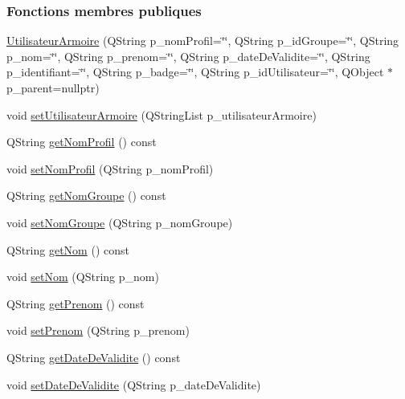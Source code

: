 \subsubsection*{Fonctions membres publiques}
\begin{DoxyCompactItemize}
\item 
\hyperlink{class_utilisateur_armoire_af2e72a14da4052a25ad02fd5876970a4}{Utilisateur\+Armoire} (Q\+String p\+\_\+nom\+Profil=\char`\"{}\char`\"{}, Q\+String p\+\_\+id\+Groupe=\char`\"{}\char`\"{}, Q\+String p\+\_\+nom=\char`\"{}\char`\"{}, Q\+String p\+\_\+prenom=\char`\"{}\char`\"{}, Q\+String p\+\_\+date\+De\+Validite=\char`\"{}\char`\"{}, Q\+String p\+\_\+identifiant=\char`\"{}\char`\"{}, Q\+String p\+\_\+badge=\char`\"{}\char`\"{}, Q\+String p\+\_\+id\+Utilisateur=\char`\"{}\char`\"{}, Q\+Object $\ast$p\+\_\+parent=nullptr)
\item 
void \hyperlink{class_utilisateur_armoire_a523423ac9e15b8260ca7f5ffc84c008d}{set\+Utilisateur\+Armoire} (Q\+String\+List p\+\_\+utilisateur\+Armoire)
\item 
Q\+String \hyperlink{class_utilisateur_armoire_a7ab03056bcfa00c2278488f5a381ac18}{get\+Nom\+Profil} () const
\item 
void \hyperlink{class_utilisateur_armoire_ad71dd9b23c6bc145a64727642b1ac3f5}{set\+Nom\+Profil} (Q\+String p\+\_\+nom\+Profil)
\item 
Q\+String \hyperlink{class_utilisateur_armoire_a714ef42e6907cf73312a55b7f896682a}{get\+Nom\+Groupe} () const
\item 
void \hyperlink{class_utilisateur_armoire_a4d2361e99dd2e84533ce8a2795607306}{set\+Nom\+Groupe} (Q\+String p\+\_\+nom\+Groupe)
\item 
Q\+String \hyperlink{class_utilisateur_armoire_a0c7b68d55b8a929a2522cc693b8e250a}{get\+Nom} () const
\item 
void \hyperlink{class_utilisateur_armoire_a8a1031cc1ca9a197e49c0adeb1f54923}{set\+Nom} (Q\+String p\+\_\+nom)
\item 
Q\+String \hyperlink{class_utilisateur_armoire_a000f0cfe0e184a298c74a5eddc39bee7}{get\+Prenom} () const
\item 
void \hyperlink{class_utilisateur_armoire_a26a7087617a276ff5c4e349bda5fed5a}{set\+Prenom} (Q\+String p\+\_\+prenom)
\item 
Q\+String \hyperlink{class_utilisateur_armoire_a83c5fad292be7c94e38fc14a5feeae7f}{get\+Date\+De\+Validite} () const
\item 
void \hyperlink{class_utilisateur_armoire_abe51b503b17f3d90c7ebe0546ed39cc0}{set\+Date\+De\+Validite} (Q\+String p\+\_\+date\+De\+Validite)

\end{DoxyCompactItemize}
